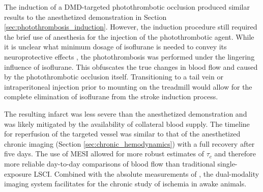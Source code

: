 The induction of a DMD-targeted photothrombotic occlusion produced similar results to the anesthetized demonstration in Section \ref{sec:photothrombosis_induction}. However, the induction procedure still required the brief use of anesthesia for the injection of the photothrombotic agent. While it is unclear what minimum dosage of isoflurane is needed to convey its neuroprotective effects \cite{Kapinya:ua}, the photothrombosis was performed under the lingering influence of isoflurane. This obfuscates the true changes in blood flow and  caused by the photothrombotic occlusion itself. Transitioning to a tail vein or intraperitoneal injection prior to mounting on the treadmill would allow for the complete elimination of isoflurane from the stroke induction process.

The resulting infarct was less severe than the anesthetized demonstration and was likely mitigated by the availability of collateral blood supply. The timeline for reperfusion of the targeted vessel was similar to that of the anesthetized chronic imaging (Section \ref{sec:chronic_hemodynamics}) with a full recovery after five days. The use of MESI allowed for more robust estimates of $\tau_c$ and therefore more reliable day-to-day comparisons of blood flow than traditional single-exposure LSCI. Combined with the absolute measurements of , the dual-modality imaging system facilitates for the chronic study of ischemia in awake animals.




